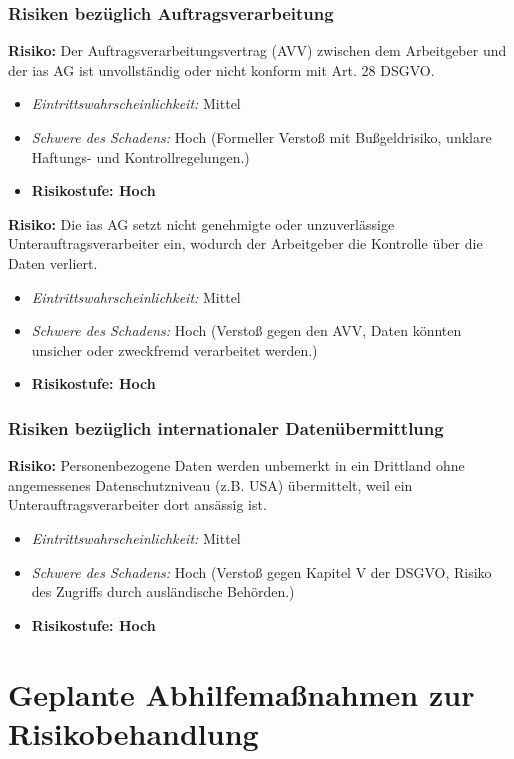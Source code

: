 \documentclass[12pt, a4paper]{article}
\begin{document}
\subsubsection{Risiken bezüglich Auftragsverarbeitung}
\textbf{Risiko:} Der Auftragsverarbeitungsvertrag (AVV) zwischen dem Arbeitgeber und der ias AG ist unvollständig oder nicht konform mit Art. 28 DSGVO.
\begin{itemize}
    \item \textit{Eintrittswahrscheinlichkeit:} Mittel
    \item \textit{Schwere des Schadens:} Hoch (Formeller Verstoß mit Bußgeldrisiko, unklare Haftungs- und Kontrollregelungen.)
    \item \textbf{Risikostufe: Hoch}
\end{itemize}

\textbf{Risiko:} Die ias AG setzt nicht genehmigte oder unzuverlässige Unterauftragsverarbeiter ein, wodurch der Arbeitgeber die Kontrolle über die Daten verliert.
\begin{itemize}
    \item \textit{Eintrittswahrscheinlichkeit:} Mittel
    \item \textit{Schwere des Schadens:} Hoch (Verstoß gegen den AVV, Daten könnten unsicher oder zweckfremd verarbeitet werden.)
    \item \textbf{Risikostufe: Hoch}
\end{itemize}

\subsubsection{Risiken bezüglich internationaler Datenübermittlung}
\textbf{Risiko:} Personenbezogene Daten werden unbemerkt in ein Drittland ohne angemessenes Datenschutzniveau (z.B. USA) übermittelt, weil ein Unterauftragsverarbeiter dort ansässig ist.
\begin{itemize}
    \item \textit{Eintrittswahrscheinlichkeit:} Mittel
    \item \textit{Schwere des Schadens:} Hoch (Verstoß gegen Kapitel V der DSGVO, Risiko des Zugriffs durch ausländische Behörden.)
    \item \textbf{Risikostufe: Hoch}
\end{itemize}

\section{Geplante Abhilfemaßnahmen zur Risikobehandlung}
\end{document}
